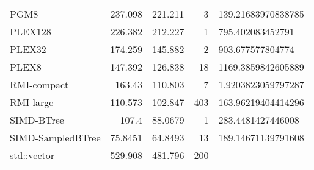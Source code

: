 \begin{tabular}{lrrrl}
 PGM8              &               237.098  &              221.211  &            3 & 139.21683970838785 \\
 PLEX128           &               226.382  &              212.227  &            1 & 795.402083452791   \\
 PLEX32            &               174.259  &              145.882  &            2 & 903.677577804774   \\
 PLEX8             &               147.392  &              126.838  &           18 & 1169.3859842605889 \\
 RMI-compact       &               163.43   &              110.803  &            7 & 1.9203823059797287 \\
 RMI-large         &               110.573  &              102.847  &          403 & 163.96219404414296 \\
 SIMD-BTree        &               107.4    &               88.0679 &            1 & 283.4481427446008  \\
 SIMD-SampledBTree &                75.8451 &               64.8493 &           13 & 189.14671139791608 \\
 std::vector       &               529.908  &              481.796  &          200 & -                  \\
\hline
\end{tabular}